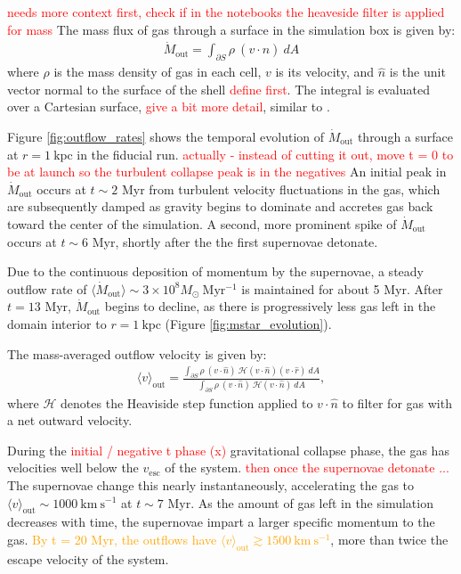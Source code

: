\documentclass[twocolumn,linenumbers]{aastex631}
\begin{document}
\textcolor{red}{needs more context first, check if in the notebooks the heaveside filter is applied for mass} The mass flux of gas through a surface in the simulation box is given by: 
\begin{align}
    \dot{M}_\mathrm{out} = \int_{\partial S} \rho \ (v \cdot \hat{n})\ dA
\end{align}
where $\rho$ is the mass density of gas in each cell, $v$ is its velocity, and $\hat{n}$ is the unit vector normal to the surface of the shell \textcolor{
red}{define first}. The integral is evaluated over a Cartesian surface, \textcolor{red}{give a bit more detail}, similar to \cite{2023MNRAS.521.5160M}. 

Figure \ref{fig:outflow_rates} shows the temporal evolution of $\dot{M}_\mathrm{out}$ through a surface at $r = 1\ \mathrm{kpc}$ in the fiducial run. \textcolor{red}{actually - instead of cutting it out, move t = 0 to be at launch so the turbulent collapse peak is in the negatives} An initial peak in $\dot{M}_\mathrm{out}$ occurs at $t \sim 2$ Myr from turbulent velocity fluctuations in the gas, which are subsequently damped as gravity begins to dominate and accretes gas back toward the center of the simulation. A second, more prominent spike of $\dot{M}_\mathrm{out}$ occurs at $t \sim 6$ Myr, shortly after the the first supernovae detonate.

Due to the continuous deposition of momentum by the supernovae, a steady outflow rate of $\langle \dot{M}_\mathrm{out} \rangle \sim 3\times 10^8 M_\odot \ \mathrm{Myr^{-1}}$ is maintained for about 5 Myr. After $t = 13$ Myr, $\dot{M}_\mathrm{out}$ begins to decline, as there is progressively less gas left in the domain interior to $r = 1\ \mathrm{kpc}$ (Figure \ref{fig:mstar_evolution}). 

The mass-averaged outflow velocity is given by:
\begin{align}
\langle v \rangle _\mathrm{out} = \frac{\int_{\partial S} \rho \ (v \cdot \hat{n})\ \mathcal{H}(v\cdot \hat{n})(v\cdot \hat{r})\ dA}{\int_{\partial S} \rho \ (v \cdot \hat{n})\ \mathcal{H}(v\cdot \hat{n})\ dA},
\end{align}
where $\mathcal{H}$ denotes the Heaviside step function applied to $v \cdot \hat{n}$ to filter for gas with a net outward velocity. 

During the \textcolor{red}{initial / negative t phase (x)} gravitational collapse phase, the gas has velocities well below the $v_\mathrm{esc}$ of the system. \textcolor{red}{then once the supernovae detonate ...} The supernovae change this nearly instantaneously, accelerating the gas to $\langle v \rangle _\mathrm{out} \sim 1000\ \mathrm{km\ s^{-1}}$ at $t \sim 7$ Myr. As the amount of gas left in the simulation decreases with time, the supernovae impart a larger specific momentum to the gas. \textcolor{orange}{By t = 20 Myr, the outflows have $\langle v \rangle _\mathrm{out} \gtrsim 1500\ \mathrm{km\ s^{-1}}$}, more than twice the escape velocity of the system.
\end{document}
